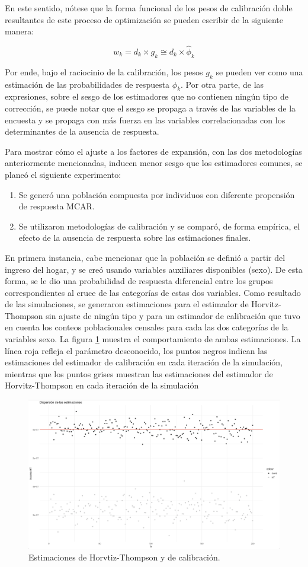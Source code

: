 \documentclass[
  12pt,
  spanish,
]{book}
\providecommand{\tightlist}{%
  \setlength{\itemsep}{0pt}\setlength{\parskip}{0pt}}
\begin{document}
En este sentido, nótese que la forma funcional de los pesos de calibración doble resultantes de este proceso de optimización se pueden escribir de la siguiente manera:

\[
w_k = d_k \times g_k  \cong d_k \times \hat \phi_k
\]

Por ende, bajo el raciocinio de la calibración, los pesos \(g_k\) se pueden ver como una estimación de las probabilidades de respuesta \(\phi_k\). Por otra parte, de las expresiones, sobre el sesgo de los estimadores que no contienen ningún tipo de corrección, se puede notar que el sesgo se propaga a través de las variables de la encuesta y se propaga con más fuerza en las variables correlacionadas con los determinantes de la ausencia de respuesta.

Para mostrar cómo el ajuste a los factores de expansión, con las dos metodologías anteriormente mencionadas, inducen menor sesgo que los estimadores comunes, se planeó el siguiente experimento:

\begin{enumerate}
\def\labelenumi{\arabic{enumi}.}
\tightlist
\item
  Se generó una población compuesta por individuos con diferente propensión de respuesta MCAR.
\item
  Se utilizaron metodologías de calibración y se comparó, de forma empírica, el efecto de la ausencia de respuesta sobre las estimaciones finales.
\end{enumerate}

En primera instancia, cabe mencionar que la población se definió a partir del ingreso del hogar, y se creó usando variables auxiliares disponibles (sexo). De esta forma, se le dio una probabilidad de respuesta diferencial entre los grupos correspondientes al cruce de las categorías de estas dos variables. Como resultado de las simulaciones, se generaron estimaciones para el estimador de Horvitz-Thompson sin ajuste de ningún tipo y para un estimador de calibración que tuvo en cuenta los conteos poblacionales censales para cada las dos categorías de la variables sexo. La figura \ref{fig:fightcal} muestra el comportamiento de ambas estimaciones. La línea roja refleja el parámetro desconocido, los puntos negros indican las estimaciones del estimador de calibración en cada iteración de la simulación, mientras que los puntos grises muestran las estimaciones del estimador de Horvitz-Thompson en cada iteración de la simulación

\begin{figure}

{\centering \includegraphics[width=0.5\linewidth]{Pics/c9} 

}

\caption{Estimaciones de Horvtiz-Thompson y de calibración.}\label{fig:fightcal}
\end{figure}
\end{document}
